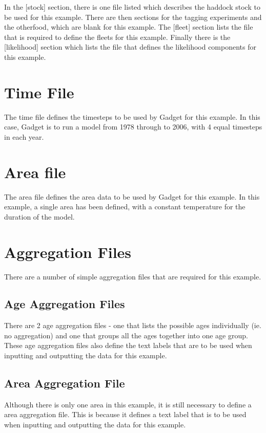 \documentclass[10pt,twoside]{article}
\begin{document}
\bigskip
In the [stock] section, there is one file listed which describes the haddock stock to be used for this example.  There are then sections for the tagging experiments and the otherfood, which are blank for this example.  The [fleet] section lists the file that is required to define the fleets for this example.  Finally there is the [likelihood] section which lists the file that defines the likelihood components for this example.

\section{Time File}
The time file defines the timesteps to be used by Gadget for this example.  In this case, Gadget is to run a model from 1978 through to 2006, with 4 equal timesteps in each year.

{\small }

\section{Area file}
The area file defines the area data to be used by Gadget for this example.  In this example, a single area has been defined, with a constant temperature for the duration of the model.

{\small }

\section{Aggregation Files}
There are a number of simple aggregation files that are required for this example.

\subsection{Age Aggregation Files}
There are 2 age aggregation files - one that lists the possible ages individually (ie. no aggregation) and one that groups all the ages together into one age group.  These age aggregation files also define the text labels that are to be used when inputting and outputting the data for this example.

{\small }
{\small }

\subsection{Area Aggregation File}
Although there is only one area in this example, it is still necessary to define a area aggregation file.  This is because it defines a text label that is to be used when inputting and outputting the data for this example.
\end{document}
